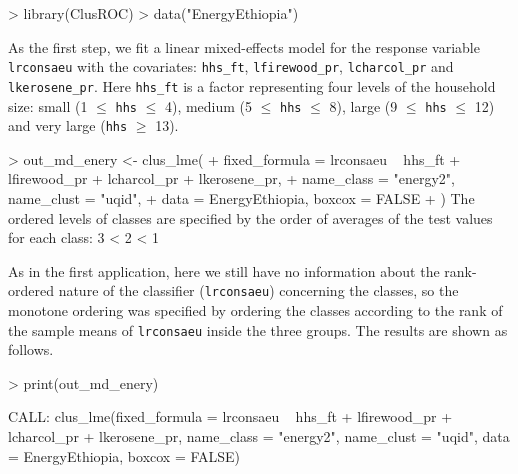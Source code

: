 {{\color{blue}
\begin{example}
> library(ClusROC)
> data("EnergyEthiopia")
\end{example}
}

As the first step, we fit a linear mixed-effects model for the response variable \texttt{lrconsaeu} with the covariates: \texttt{hhs\_ft}, \texttt{lfirewood\_pr}, \texttt{lcharcol\_pr} and \texttt{lkerosene\_pr}. Here \texttt{hhs\_ft} is a factor representing four levels of the household size: small (1 $\le$ \texttt{hhs} $\le$ 4), medium (5 $\le$ \texttt{hhs} $\le$ 8), large (9 $\le$ \texttt{hhs} $\le$ 12) and very large (\texttt{hhs} $\ge$ 13).
\begin{example}
> out_md_enery <- clus_lme(
+   fixed_formula = lrconsaeu ~ hhs_ft + lfirewood_pr + lcharcol_pr + lkerosene_pr,
+   name_class = "energy2", name_clust = "uqid",
+   data = EnergyEthiopia, boxcox = FALSE
+ )
The ordered levels of classes are specified by the order of 
 averages of the test values for each class:
3 < 2 < 1
\end{example}
As in the first application, here we still have no information about the rank-ordered nature of the classifier (\texttt{lrconsaeu}) concerning the classes, so the monotone ordering was specified by ordering the classes according to the rank of the sample means of \texttt{lrconsaeu} inside the three groups. The results are shown as follows.
\begin{example}
> print(out_md_enery)

CALL: clus_lme(fixed_formula = lrconsaeu ~ hhs_ft + lfirewood_pr + 
    lcharcol_pr + lkerosene_pr, name_class = "energy2", name_clust = "uqid", 
    data = EnergyEthiopia, boxcox = FALSE)
 

\end{example}}
